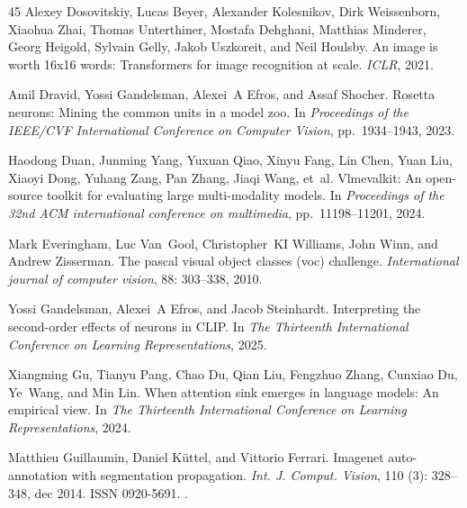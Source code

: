\documentclass{article}
\begin{document}
\begin{thebibliography}{45}
Alexey Dosovitskiy, Lucas Beyer, Alexander Kolesnikov, Dirk Weissenborn, Xiaohua Zhai, Thomas Unterthiner, Mostafa Dehghani, Matthias Minderer, Georg Heigold, Sylvain Gelly, Jakob Uszkoreit, and Neil Houlsby.
\newblock An image is worth 16x16 words: Transformers for image recognition at scale.
\newblock \emph{ICLR}, 2021.

Amil Dravid, Yossi Gandelsman, Alexei~A Efros, and Assaf Shocher.
\newblock Rosetta neurons: Mining the common units in a model zoo.
\newblock In \emph{Proceedings of the IEEE/CVF International Conference on Computer Vision}, pp.\  1934--1943, 2023.

Haodong Duan, Junming Yang, Yuxuan Qiao, Xinyu Fang, Lin Chen, Yuan Liu, Xiaoyi Dong, Yuhang Zang, Pan Zhang, Jiaqi Wang, et~al.
\newblock Vlmevalkit: An open-source toolkit for evaluating large multi-modality models.
\newblock In \emph{Proceedings of the 32nd ACM international conference on multimedia}, pp.\  11198--11201, 2024.

Mark Everingham, Luc Van~Gool, Christopher~KI Williams, John Winn, and Andrew Zisserman.
\newblock The pascal visual object classes (voc) challenge.
\newblock \emph{International journal of computer vision}, 88: 303--338, 2010.

Yossi Gandelsman, Alexei~A Efros, and Jacob Steinhardt.
\newblock Interpreting the second-order effects of neurons in {CLIP}.
\newblock In \emph{The Thirteenth International Conference on Learning Representations}, 2025.

Xiangming Gu, Tianyu Pang, Chao Du, Qian Liu, Fengzhuo Zhang, Cunxiao Du, Ye~Wang, and Min Lin.
\newblock When attention sink emerges in language models: An empirical view.
\newblock In \emph{The Thirteenth International Conference on Learning Representations}, 2024.

Matthieu Guillaumin, Daniel K\"{u}ttel, and Vittorio Ferrari.
\newblock Imagenet auto-annotation with segmentation propagation.
\newblock \emph{Int. J. Comput. Vision}, 110 (3): 328–348, dec 2014.
\newblock ISSN 0920-5691.
\newblock {}.


\end{thebibliography}
\end{document}

